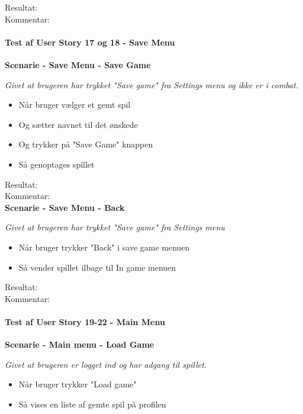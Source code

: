 Resultat:\\
Kommentar:\\

\paragraph{Test af User Story 17 og 18 - Save Menu}

\textbf{Scenarie - Save Menu - Save Game}

\textit{Givet at brugeren har trykket "Save game" fra Settings menu og ikke er i combat.}

\begin{itemize}
  \item Når bruger vælger et gemt spil
  \item Og sætter navnet til det ønskede
  \item Og trykker på "Save Game" knappen
  \item Så genoptages spillet
\end{itemize}

Resultat:\\
Kommentar:\\

\textbf{Scenarie - Save Menu - Back}

\textit{Givet at brugeren har trykket "Save game" fra Settings menu}

\begin{itemize}
  \item Når bruger trykker "Back" i save game menuen
  \item Så vender spillet ilbage til In game menuen
\end{itemize}

Resultat:\\
Kommentar:

\paragraph{Test af User Story 19-22 - Main Menu}

\textbf{Scenarie - Main menu - Load Game}

\textit{Givet at brugeren er logget ind og har adgang til spillet.}

\begin{itemize}
  \item Når bruger trykker "Load game"
  \item Så vises en liste af gemte spil på profilen
\end{itemize}

